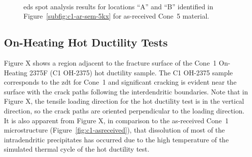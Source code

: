 \begin{figure}
\centering
{} \\
\caption[]{\Gls{eds} spot analysis results for locations ``A'' and ``B'' identified in Figure~\ref{subfig:c1-ar-sem-5kx} for as-received Cone~5 material.}
\label{fig:c5-ar-eds}
\end{figure}


\subsection{On-Heating Hot Ductility Tests}
Figure X shows a region adjacent to the fracture surface of the Cone~1 On-Heating 2375\textdegree{}F (C1 OH-2375) hot ductility sample. The C1 OH-2375 sample corresponds to the \gls{zdt} for Cone~1 and significant cracking is evident near the surface with the crack paths following the interdendritic boundaries. Note that in Figure X, the tensile loading direction for the hot ductility test is in the vertical direction, so the crack paths are oriented perpendicular to the loading direction. It is also apparent from Figure X, in comparison to the as-received Cone~1 microstructure (Figure~\ref{fig:c1-asreceived}), that dissolution of most of the intradendritic precipitates has occurred due to the high temperature of the simulated thermal cycle of the hot ductility test.

